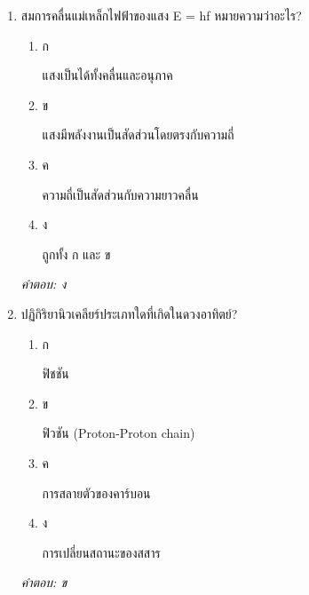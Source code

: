 \documentclass[12pt]{article}
\begin{document}
\begin{enumerate}[label=\arabic*., itemsep=0.5\baselineskip, topsep=0.5\baselineskip, leftmargin=*]
\item สมการคลื่นแม่เหล็กไฟฟ้าของแสง E = hf หมายความว่าอะไร?
\begin{enumerate}[label=\alph*)., itemsep=0.3\baselineskip, topsep=0.3\baselineskip]
\item ก\ 
\begin{minipage}[t]{0.9\linewidth}
\raggedright แสงเป็นได้ทั้งคลื่นและอนุภาค
\end{minipage}
\item ข\ 
\begin{minipage}[t]{0.9\linewidth}
\raggedright แสงมีพลังงานเป็นสัดส่วนโดยตรงกับความถี่
\end{minipage}
\item ค\ 
\begin{minipage}[t]{0.9\linewidth}
\raggedright ความถี่เป็นสัดส่วนกับความยาวคลื่น
\end{minipage}
\item ง\ 
\begin{minipage}[t]{0.9\linewidth}
\raggedright ถูกทั้ง ก และ ข
\end{minipage}
\end{enumerate}
\vspace{-0.3\baselineskip}
\begin{small}
\textit{คำตอบ: ง}
\end{small}

\item ปฏิกิริยานิวเคลียร์ประเภทใดที่เกิดในดวงอาทิตย์?
\begin{enumerate}[label=\alph*)., itemsep=0.3\baselineskip, topsep=0.3\baselineskip]
\item ก\ 
\begin{minipage}[t]{0.9\linewidth}
\raggedright ฟิชชัน
\end{minipage}
\item ข\ 
\begin{minipage}[t]{0.9\linewidth}
\raggedright ฟิวชัน (Proton-Proton chain)
\end{minipage}
\item ค\ 
\begin{minipage}[t]{0.9\linewidth}
\raggedright การสลายตัวของคาร์บอน
\end{minipage}
\item ง\ 
\begin{minipage}[t]{0.9\linewidth}
\raggedright การเปลี่ยนสถานะของสสาร
\end{minipage}
\end{enumerate}
\vspace{-0.3\baselineskip}
\begin{small}
\textit{คำตอบ: ข}
\end{small}


\end{enumerate}
\end{document}
